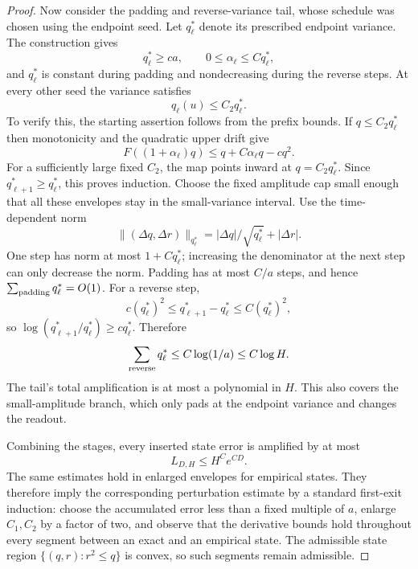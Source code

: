 \begin{proof}
Now consider the padding and reverse-variance tail, whose schedule was chosen using the endpoint seed. Let $q_\ell^*$ denote its prescribed endpoint variance. The construction gives
\[
 q_\ell^*\ge ca,\qquad
 0\le\alpha_\ell\le Cq_\ell^*,
\]
and $q_\ell^*$ is constant during padding and nondecreasing during the reverse steps. At every other seed the variance satisfies
\[
 q_\ell(u)\le C_2 q_\ell^*.
\]
To verify this, the starting assertion follows from the prefix bounds. If $q\le C_2q_\ell^*$ then monotonicity and the quadratic upper drift give
\[
 F((1+\alpha_\ell)q)
 \le q+C\alpha_\ell q-cq^2.
\]
For a sufficiently large fixed $C_2$, the map points inward at $q=C_2q_\ell^*$. Since $q_{\ell+1}^*\ge q_\ell^*$, this proves induction. Choose the fixed amplitude cap small enough that all these envelopes stay in the small-variance interval.
Use the time-dependent norm
\[
 \|(\Delta q,\Delta r)\|_{q_\ell^*}
       =|\Delta q|/\sqrt{q_\ell^*}+|\Delta r|.
\]
One step has norm at most $1+Cq_\ell^*$; increasing the denominator at the next step can only decrease the norm. Padding has at most $C/a$ steps, and hence $\sum_{\rm padding}q_\ell^*=O(1)$. For a reverse step,
\[
 c(q_\ell^*)^2\le q_{\ell+1}^*-q_\ell^*
                         \le C(q_\ell^*)^2,
\]
so $\log(q_{\ell+1}^*/q_\ell^*)\ge cq_\ell^*$. Therefore
\[
 \sum_{\rm reverse}q_\ell^*\le C\log(1/a)\le C\log H.
\]
The tail's total amplification is at most a polynomial in $H$. This also covers the small-amplitude branch, which only pads at the endpoint variance and changes the readout.

Combining the stages, every inserted state error is amplified by at most
\[
 L_{D,H}\le H^C e^{CD}.
\]
The same estimates hold in enlarged envelopes for empirical states. They therefore imply the corresponding perturbation estimate by a standard first-exit induction: choose the accumulated error less than a fixed multiple of $a$, enlarge $C_1,C_2$ by a factor of two, and observe that the derivative bounds hold throughout every segment between an exact and an empirical state. The admissible state region $\{(q,r):r^2\le q\}$ is convex, so such segments remain admissible.


\end{proof}
